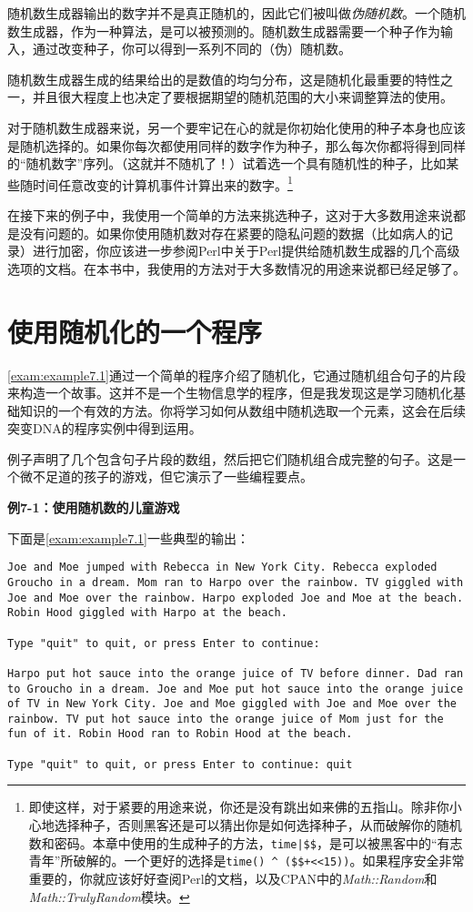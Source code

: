 随机数生成器输出的数字并不是真正随机的，因此它们被叫做\textit{伪随机数}。一个随机数生成器，作为一种算法，是可以被预测的。随机数生成器需要一个种子作为输入，通过改变种子，你可以得到一系列不同的（伪）随机数。

随机数生成器生成的结果给出的是数值的均匀分布，这是随机化最重要的特性之一，并且很大程度上也决定了要根据期望的随机范围的大小来调整算法的使用。

对于随机数生成器来说，另一个要牢记在心的就是你初始化使用的种子本身也应该是随机选择的。如果你每次都使用同样的数字作为种子，那么每次你都将得到同样的“随机数字”序列。（这就并不随机了！）试着选一个具有随机性的种子，比如某些随时间任意改变的计算机事件计算出来的数字。\footnote{即使这样，对于紧要的用途来说，你还是没有跳出如来佛的五指山。除非你小心地选择种子，否则黑客还是可以猜出你是如何选择种子，从而破解你的随机数和密码。本章中使用的生成种子的方法，\verb=time|$$=，是可以被黑客中的“有志青年”所破解的。一个更好的选择是\verb=time() ^ ($$+<<15))=。如果程序安全非常重要的，你就应该好好查阅Perl的文档，以及CPAN中的\textit{Math::Random}和\textit{Math::TrulyRandom}模块。}

在接下来的例子中，我使用一个简单的方法来挑选种子，这对于大多数用途来说都是没有问题的。如果你使用随机数对存在紧要的隐私问题的数据（比如病人的记录）进行加密，你应该进一步参阅Perl中关于Perl提供给随机数生成器的几个高级选项的文档。在本书中，我使用的方法对于大多数情况的用途来说都已经足够了。

\section{使用随机化的一个程序}
\autoref{exam:example7.1}通过一个简单的程序介绍了随机化，它通过随机组合句子的片段来构造一个故事。这并不是一个生物信息学的程序，但是我发现这是学习随机化基础知识的一个有效的方法。你将学习如何从数组中随机选取一个元素，这会在后续突变DNA的程序实例中得到运用。

例子声明了几个包含句子片段的数组，然后把它们随机组合成完整的句子。这是一个微不足道的孩子的游戏，但它演示了一些编程要点。

\textbf{例7-1：使用随机数的儿童游戏}


下面是\autoref{exam:example7.1}一些典型的输出：

\begin{lstlisting}[breaklines=true]
Joe and Moe jumped with Rebecca in New York City. Rebecca exploded Groucho in a dream. Mom ran to Harpo over the rainbow. TV giggled with Joe and Moe over the rainbow. Harpo exploded Joe and Moe at the beach. Robin Hood giggled with Harpo at the beach. 

Type "quit" to quit, or press Enter to continue: 

Harpo put hot sauce into the orange juice of TV before dinner. Dad ran to Groucho in a dream. Joe and Moe put hot sauce into the orange juice of TV in New York City. Joe and Moe giggled with Joe and Moe over the rainbow. TV put hot sauce into the orange juice of Mom just for the fun of it. Robin Hood ran to Robin Hood at the beach. 

Type "quit" to quit, or press Enter to continue: quit
\end{lstlisting}

